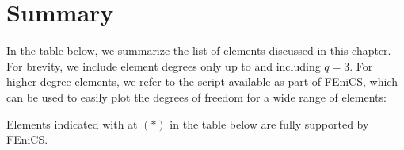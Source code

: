 \section{Summary}

In the table below, we summarize the list of elements discussed in
this chapter. For brevity, we include element degrees only up to and
including $q = 3$. For higher degree elements, we refer to the script
 available as part of FEniCS, which can be used to
easily plot the degrees of freedom for a wide range of elements:
Elements indicated with at $(*)$ in the table below are fully
supported by FEniCS.


